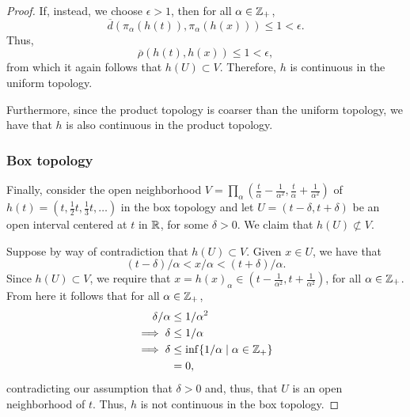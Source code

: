 \begin{solution}
\begin{proof}
        If, instead, we choose $\epsilon > 1$, then for all $\alpha \in \mathbb{Z}_+$,
        \begin{equation*}
          \overline{d}(\pi_\alpha(h(t)), \pi_\alpha(h(x))) \leq 1 < \epsilon.
        \end{equation*}
        Thus,
        \begin{equation*}
          \overline{\rho}(h(t), h(x)) \leq 1 < \epsilon,
        \end{equation*}
        from which it again follows that $h(U) \subset V$.
        Therefore, $h$ is continuous in the uniform topology.

        Furthermore, since the product topology is coarser than the uniform topology, we have that $h$ is also continuous in the product topology.

        \subsubsection*{Box topology}
        Finally, consider the open neighborhood $V = \prod_\alpha (\tfrac{t}{\alpha} - \tfrac{1}{\alpha^2}, \tfrac{t}{\alpha} + \tfrac{1}{\alpha^2})$ of $h(t) = (t, \tfrac{1}{2} t, \tfrac{1}{3} t, \ldots)$ in the box topology and let $U = (t - \delta, t + \delta)$ be an open interval centered at $t$ in $\mathbb{R}$, for some $\delta > 0$.
        We claim that $h(U) \not\subset V$.

        Suppose by way of contradiction that $h(U) \subset V$.
        Given $x \in U$, we have that
        \begin{equation*}
            (t - \delta) / \alpha < x / \alpha < (t + \delta) / \alpha.
        \end{equation*}
        Since $h(U) \subset V$, we require that $x = h(x)_\alpha \in (t - \tfrac{1}{\alpha^2}, t + \tfrac{1}{\alpha^2})$, for all $\alpha \in \mathbb{Z}_+$.
        From here it follows that for all $\alpha \in \mathbb{Z}_+$,
        \begin{align*}
            \delta / \alpha &\leq 1 / \alpha^2 \\
            \implies \delta &\leq 1 / \alpha \\
            \implies \delta &\leq \inf\{1 / \alpha \mid \alpha \in \mathbb{Z}_+\} \\
                            &= 0,
        \end{align*}
        contradicting our assumption that $\delta > 0$ and, thus, that $U$ is an open neighborhood of $t$.
        Thus, $h$ is not continuous in the box topology.
    \end{proof}
    \bigskip


\end{solution}
